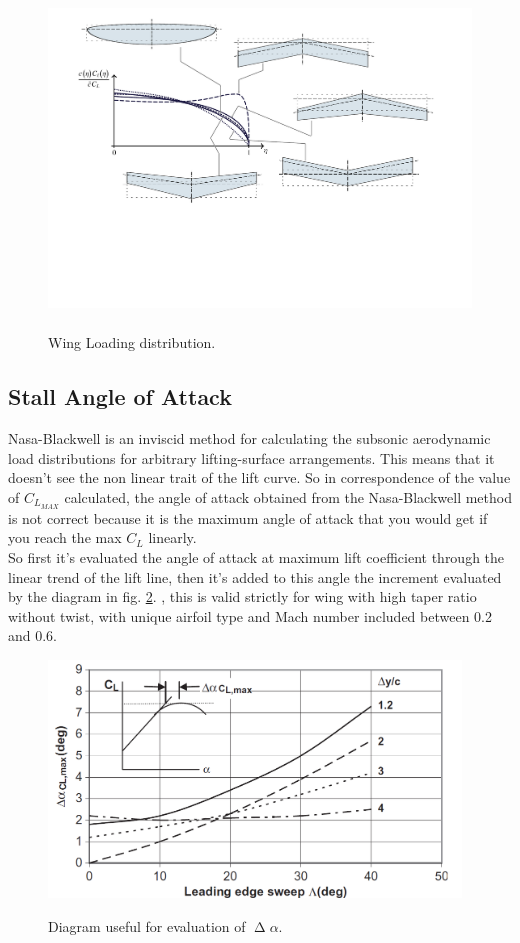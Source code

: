 \begin{figure}[H]
\centering
{\includegraphics[height=8.3cm]{Immagini/wing_loading_B}} 
\caption{Wing Loading distribution.}
\label{fig:wl}
\end{figure}

\subsection{Stall Angle of Attack}

Nasa-Blackwell is an inviscid method for calculating the subsonic aerodynamic load distributions for arbitrary lifting-surface arrangements. This means that it doesn't see the non linear trait of the lift curve. So in correspondence of the value of $C_{L_{MAX}}$ calculated, the angle of attack obtained from the Nasa-Blackwell method is not correct because it is the maximum angle of attack that you would get if you reach the max $C_L$ linearly.\\
So first it’s evaluated the angle of attack at maximum lift coefficient through the linear trend of the lift line, then it’s added to this angle the increment evaluated by the diagram in fig. \ref{fig:dealpha}. , this is valid strictly for wing with high taper ratio without twist, with unique airfoil type and Mach number included between 0.2 and 0.6.


\begin{figure}[H]
\centering
{\includegraphics[height=6.3cm]{Immagini/deltaAlphaSforza.png}} 
\caption{Diagram useful for evaluation of $\upDelta \alpha$.}
\label{fig:dealpha}
\end{figure}



